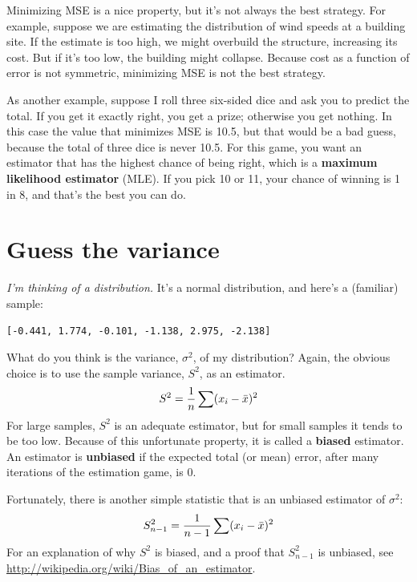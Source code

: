 \documentclass[12pt]{book}
\begin{document}
Minimizing MSE is a nice property, but it's not always the best
strategy.  For example, suppose we are estimating the distribution of
wind speeds at a building site.  If the estimate is too high, we might
overbuild the structure, increasing its cost.  But if it's too
low, the building might collapse.  Because cost as a function of
error is not symmetric, minimizing MSE is not the best strategy.

As another example, suppose I roll three six-sided dice and ask you to
predict the total.  If you get it exactly right, you get a prize;
otherwise you get nothing.  In this case the value that minimizes MSE
is 10.5, but that would be a bad guess, because the total of three
dice is never 10.5.  For this game, you want an estimator that has the
highest chance of being right, which is a {\bf maximum likelihood
  estimator} (MLE).  If you pick 10 or 11, your chance of winning is 1
in 8, and that's the best you can do.  


\section{Guess the variance}

{\em I'm thinking of a distribution\/.}  It's a normal distribution, and 
here's a (familiar) sample:

\verb"[-0.441, 1.774, -0.101, -1.138, 2.975, -2.138]"

What do you think is the variance, $\sigma^2$, of my distribution?
Again, the obvious choice is to use the sample variance, $S^2$, as an
estimator.
%
\[ S^2 = \frac{1}{n} \sum (x_i - \bar{x})^2 \] 
%
For large samples, $S^2$ is an adequate estimator, but for small
samples it tends to be too low.  Because of this unfortunate
property, it is called a {\bf biased} estimator.
An estimator is {\bf unbiased} if the expected total (or mean) error,
after many iterations of the estimation game, is 0.

Fortunately, there is another simple statistic that is an unbiased
estimator of $\sigma^2$:
%
\[ S_{n-1}^2 = \frac{1}{n-1} \sum (x_i - \bar{x})^2 \] 
%
For an explanation of why $S^2$ is biased, and a proof that
$S_{n-1}^2$ is unbiased, see
\url{http://wikipedia.org/wiki/Bias_of_an_estimator}.
\end{document}
